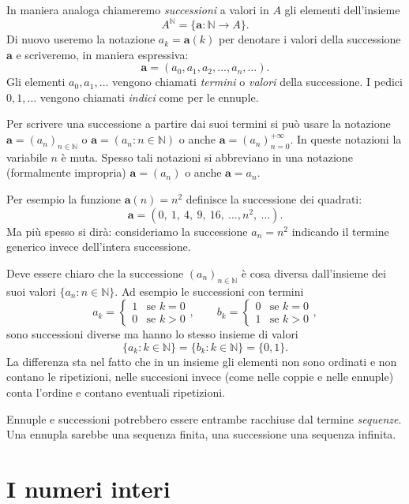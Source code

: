 \documentclass[italian,a4paper,hidelinks,headinclude]{scrartcl}
\newcommand{\NN}{{\mathbb N}}
\renewcommand{\vec}[1]{\boldsymbol{#1}}
\begin{document}
In maniera analoga chiameremo \emph{successioni} a valori in $A$ gli
elementi dell'insieme
\[
  A^\NN = \{\vec a\colon \NN \to A\}.
\]
Di nuovo useremo la notazione $a_k = \vec a(k)$ per denotare i valori
della successione $\vec a$ e scriveremo, in maniera espressiva:
\[
  \vec a = (a_0, a_1, a_2, \dots, a_n, \dots).
\]
Gli elementi $a_0, a_1, \dots$ vengono chiamati \emph{termini} o \emph{valori}
della successione. I pedici $0,1,\dots$ vengono chiamati \emph{indici} come per
le ennuple.

Per scrivere una successione a partire dai suoi termini
si può usare la notazione $\vec a = (a_n)_{n\in \NN}$ o
$\vec a = (a_n \colon n \in \NN)$
o anche
$\vec a = (a_n)_{n=0}^{+\infty}$. In queste notazioni la variabile $n$ è muta.
Spesso tali notazioni si abbreviano in una
notazione (formalmente impropria) $\vec a = (a_n)$ o anche $\vec a = a_n$.

Per esempio la funzione $\vec a (n) = n^2$ definisce la successione dei quadrati:
\[
 \vec a = (0,\ 1,\ 4,\ 9,\ 16,\ \dots, n^2,\ \dots).
\]
Ma più spesso si dirà: consideriamo la successione $a_n = n^2$ indicando il
termine generico invece dell'intera successione.

Deve essere chiaro che la successione $(a_n)_{n\in \NN}$ è cosa diversa
dall'insieme dei suoi valori $\{a_n\colon n\in \NN\}$.
Ad esempio
le successioni con termini
\[
a_k = \begin{cases}
      1 & \text{se $k=0$}\\
      0 & \text{se $k>0$}
      \end{cases},
       \qquad
b_k = \begin{cases}
     0 & \text{se $k=0$}\\
     1 & \text{se $k>0$}
     \end{cases},
\]
sono successioni diverse ma hanno lo stesso insieme di valori
\[
\{a_k\colon k\in \NN\} = \{b_k \colon k\in \NN \} = \{ 0, 1\}.
\]
La differenza sta nel fatto che in un insieme gli elementi non sono ordinati
e non contano le ripetizioni,
nelle succesioni invece (come nelle coppie e nelle ennuple) conta l'ordine e
contano eventuali ripetizioni.

Ennuple e successioni potrebbero essere entrambe racchiuse dal termine
\emph{sequenze}.
Una ennupla sarebbe una sequenza finita, una successione una sequenza infinita.

\section{I numeri interi}
\end{document}
